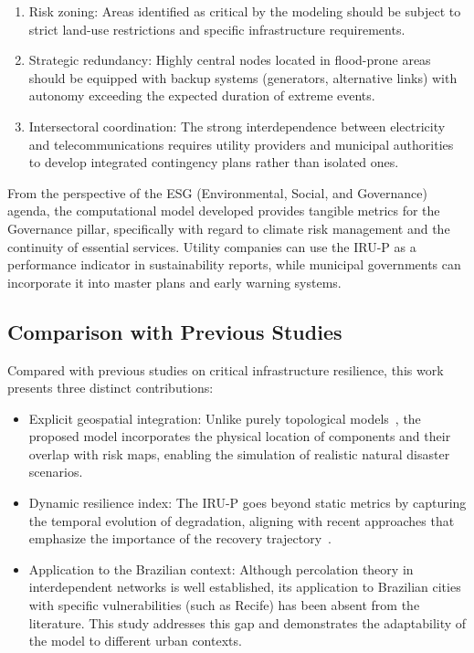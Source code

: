 \documentclass[journal]{IEEEtran}
\begin{document}
\begin{enumerate}
\item Risk zoning: Areas identified as critical by the modeling should be subject to strict land-use restrictions and specific infrastructure requirements.
\item Strategic redundancy: Highly central nodes located in flood-prone areas should be equipped with backup systems (generators, alternative links) with autonomy exceeding the expected duration of extreme events.
\item Intersectoral coordination: The strong interdependence between electricity and telecommunications requires utility providers and municipal authorities to develop integrated contingency plans rather than isolated ones.
\end{enumerate}

From the perspective of the ESG (Environmental, Social, and Governance) agenda, the computational model developed provides tangible metrics for the Governance pillar, specifically with regard to climate risk management and the continuity of essential services. Utility companies can use the IRU-P as a performance indicator in sustainability reports, while municipal governments can incorporate it into master plans and early warning systems.


\subsection{Comparison with Previous Studies}
Compared with previous studies on critical infrastructure resilience, this work presents three distinct contributions:

\begin{itemize}
\item Explicit geospatial integration: Unlike purely topological models~\cite{buldyrev2010,newman2018}, the proposed model incorporates the physical location of components and their overlap with risk maps, enabling the simulation of realistic natural disaster scenarios.
\item Dynamic resilience index: The IRU-P goes beyond static metrics by capturing the temporal evolution of degradation, aligning with recent approaches that emphasize the importance of the recovery trajectory~\cite{resilience_review}.
\item Application to the Brazilian context: Although percolation theory in interdependent networks is well established, its application to Brazilian cities with specific vulnerabilities (such as Recife) has been absent from the literature. This study addresses this gap and demonstrates the adaptability of the model to different urban contexts.
\end{itemize}
\end{document}
